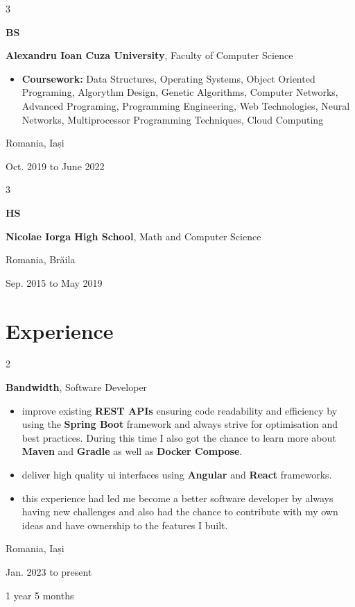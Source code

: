 \documentclass[10pt, letterpaper]{article}
\newenvironment{highlights}{
    \begin{itemize}[
        topsep=0.10 cm,
        parsep=0.10 cm,
        partopsep=0pt,
        itemsep=0pt,
        leftmargin=0.4 cm + 10pt
    ]
}{
    \end{itemize}
} %
\newenvironment{twocolentry}[2][]{
    \onecolentry
    \def\secondColumn{#2}
    \setcolumnwidth{\fill, 4.5 cm}
    \begin{paracol}{2}
}{
    \switchcolumn \raggedleft \secondColumn
    \end{paracol}
    \endonecolentry
} %
\newenvironment{threecolentry}[3][]{
    \onecolentry
    \def\thirdColumn{#3}
    \setcolumnwidth{1 cm, \fill, 4.5 cm}
    \begin{paracol}{3}
    {\raggedright #2} \switchcolumn
}{
    \switchcolumn \raggedleft \thirdColumn
    \end{paracol}
    \endonecolentry
} %
\begin{document}
        \begin{threecolentry}{\textbf{BS}}{ 
            Romania, Iași
            
            Oct. 2019 to June 2022
        }
            \textbf{Alexandru Ioan Cuza University}, Faculty of Computer Science
            \begin{highlights}
                \item \textbf{Coursework:} Data Structures, Operating Systems, Object Oriented Programing, Algorythm Design, Genetic Algorithms, Computer Networks, Advanced Programing, Programming Engineering, Web Technologies, Neural Networks, 
                Multiprocessor Programming Techniques, Cloud Computing
            \end{highlights}
        \end{threecolentry}


       \vspace{0.2 cm}


        \begin{threecolentry}{\textbf{HS}}{ 
            Romania, Brăila
            
            Sep. 2015 to May 2019
        }
            \textbf{Nicolae Iorga High School}, Math and Computer Science
        \end{threecolentry}

    
    \section{Experience}



        
        \begin{twocolentry}{
            Romania, Iași

            Jan. 2023 to present

            1 year 5 months
        }
            \textbf{Bandwidth}, Software Developer
            \begin{highlights}
                \item improve existing \textbf{REST APIs} ensuring code readability and efficiency by using the \textbf{Spring Boot} framework and always strive for optimisation
                and best practices. During this time I also got the chance to learn more about \textbf{Maven} and \textbf{Gradle} as well as \textbf{Docker Compose}.
                
                \item deliver high quality ui interfaces using \textbf{Angular} and \textbf{React} frameworks.
                
                \item this experience had led me become a better software developer by always having
                new challenges and also had the chance to contribute with my own ideas and have ownership to the features I built.
            \end{highlights}
        \end{twocolentry}
\end{document}
